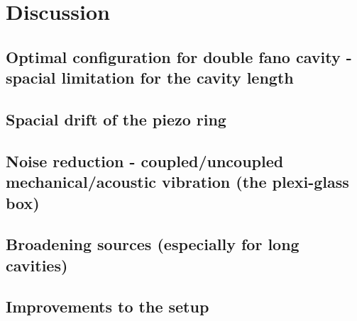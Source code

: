 \section{Discussion}

\subsection{Optimal configuration for double fano cavity - spacial limitation for the cavity length}

\subsection{Spacial drift of the piezo ring}

\subsection{Noise reduction - coupled/uncoupled mechanical/acoustic vibration (the plexi-glass box)}

\subsection{Broadening sources (especially for long cavities)}

\subsection{Improvements to the setup}
